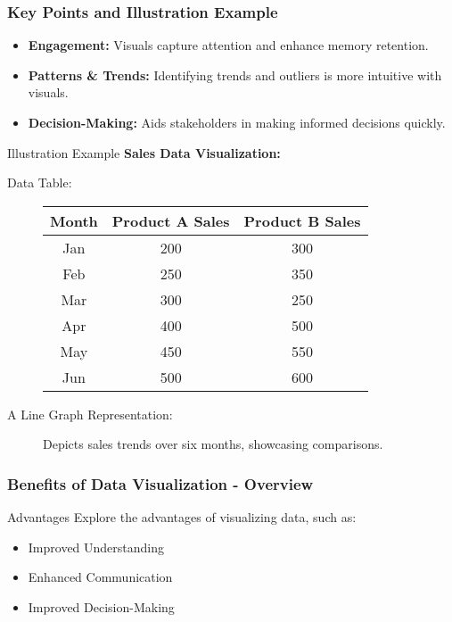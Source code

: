 \documentclass[aspectratio=169]{beamer}
\begin{document}
\begin{frame}[fragile]
    \frametitle{Key Points and Illustration Example}

    \begin{itemize}
        \item \textbf{Engagement:} Visuals capture attention and enhance memory retention.
        \item \textbf{Patterns \& Trends:} Identifying trends and outliers is more intuitive with visuals.
        \item \textbf{Decision-Making:} Aids stakeholders in making informed decisions quickly.
    \end{itemize}

    \begin{block}{Illustration Example}
        \textbf{Sales Data Visualization:} 
        \begin{description}
            \item[Data Table:] 
            \begin{tabular}{|c|c|c|}
                \hline
                Month & Product A Sales & Product B Sales \\
                \hline
                Jan & 200 & 300 \\
                Feb & 250 & 350 \\
                Mar & 300 & 250 \\
                Apr & 400 & 500 \\
                May & 450 & 550 \\
                Jun & 500 & 600 \\
                \hline
            \end{tabular}
            \item[A Line Graph Representation:] Depicts sales trends over six months, showcasing comparisons.
        \end{description}
    \end{block}
\end{frame}

\begin{frame}[fragile]
    \frametitle{Benefits of Data Visualization - Overview}
    \begin{block}{Advantages}
        Explore the advantages of visualizing data, such as:
        \begin{itemize}
            \item Improved Understanding
            \item Enhanced Communication
            \item Improved Decision-Making
        \end{itemize}
    \end{block}
\end{frame}
\end{document}
